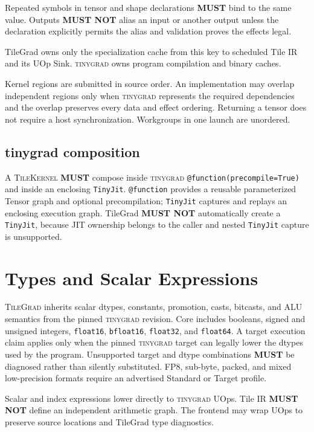 \documentclass[10pt,letterpaper]{article}
\newcommand{\TileGrad}{\textsc{TileGrad}}
\newcommand{\tinygrad}{\textsc{tinygrad}}
\newcommand{\op}[1]{\textsc{#1}}
\newcommand{\must}{\textbf{MUST}}
\newcommand{\mustnot}{\textbf{MUST NOT}}
\begin{document}
Repeated symbols in tensor and shape declarations \must{} bind to the same
value. Outputs \mustnot{} alias an input or another output unless the
declaration explicitly permits the alias and validation proves the effects
legal.

TileGrad owns only the specialization cache from this key to scheduled Tile IR
and its UOp Sink. \tinygrad{} owns program compilation and binary caches.

Kernel regions are submitted in source order. An implementation may overlap
independent regions only when \tinygrad{} represents the required dependencies
and the overlap preserves every data and effect ordering. Returning a tensor
does not require a host synchronization. Workgroups in one launch are
unordered.

\subsection*{tinygrad composition}

A \op{TileKernel} \must{} compose inside \tinygrad{}
\texttt{@function(precompile=True)} and inside an enclosing
\texttt{TinyJit}. \texttt{@function} provides a reusable parameterized Tensor
graph and optional precompilation; \texttt{TinyJit} captures and replays an
enclosing execution graph. TileGrad \mustnot{} automatically create a
\texttt{TinyJit}, because JIT ownership belongs to the caller and nested
\texttt{TinyJit} capture is unsupported.

\section*{Types and Scalar Expressions}

\TileGrad{} inherits scalar dtypes, constants, promotion, casts, bitcasts, and
ALU semantics from the pinned \tinygrad{} revision. Core includes booleans,
signed and unsigned integers, \texttt{float16}, \texttt{bfloat16},
\texttt{float32}, and \texttt{float64}. A target execution claim applies only
when the pinned \tinygrad{} target can legally lower the dtypes used by the
program. Unsupported target and dtype combinations \must{} be diagnosed rather
than silently substituted. FP8, sub-byte, packed, and mixed low-precision
formats require an advertised Standard or Target profile.

Scalar and index expressions lower directly to \tinygrad{} UOps. Tile IR
\mustnot{} define an independent arithmetic graph. The frontend may wrap UOps
to preserve source locations and TileGrad type diagnostics.
\end{document}

